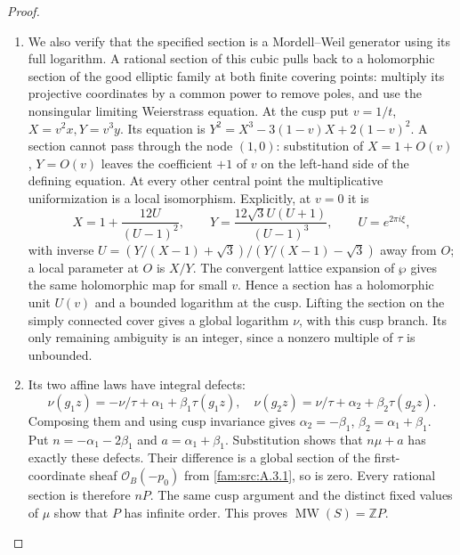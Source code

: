 \begin{proof}
\begin{enumerate}[label=\arabic*.,leftmargin=*]
\item We also verify that the specified section is a Mordell--Weil generator using its full logarithm. A rational section of this cubic pulls back to a holomorphic section of the good elliptic family at both finite covering points: multiply its projective coordinates by a common power to remove poles, and use the nonsingular limiting Weierstrass equation. At the cusp put $v=1/t$, $X=v^2x,Y=v^3y$. Its equation is $Y^2=X^3-3(1-v)X+2(1-v)^2$. A section cannot pass through the node $(1,0)$: substitution of $X=1+O(v)$, $Y=O(v)$ leaves the coefficient $+1$ of $v$ on the left-hand side of the defining equation. At every other central point the multiplicative uniformization is a local isomorphism. Explicitly, at $v=0$ it is
\[
 X=1+\frac{12U}{(U-1)^2},\qquad
 Y=\frac{12\sqrt3 U(U+1)}{(U-1)^3},\qquad U=e^{2\pi i\xi},
\]
with inverse $U=(Y/(X-1)+\sqrt3)/(Y/(X-1)-\sqrt3)$ away from $O$; a local parameter at $O$ is $X/Y$. The convergent lattice expansion of $\wp$ gives the same holomorphic map for small $v$. Hence a section has a holomorphic unit $U(v)$ and a bounded logarithm at the cusp. Lifting the section on the simply connected cover gives a global logarithm $\nu$, with this cusp branch. Its only remaining ambiguity is an integer, since a nonzero multiple of $\tau$ is unbounded.

\item Its two affine laws have integral defects:
\[
 \nu(g_1z)=-\nu/\tau+\alpha_1+\beta_1\tau(g_1z),\quad
 \nu(g_2z)=\nu/\tau+\alpha_2+\beta_2\tau(g_2z).
\]
Composing them and using cusp invariance gives $\alpha_2=-\beta_1$, $\beta_2=\alpha_1+\beta_1$. Put $n=-\alpha_1-2\beta_1$ and $a=\alpha_1+\beta_1$. Substitution shows that $n\mu+a$ has exactly these defects. Their difference is a global section of the first-coordinate sheaf $\mathcal O_B(-p_0)$ from \ref{fam:src:A.3.1}, so is zero. Every rational section is therefore $nP$. The same cusp argument and the distinct fixed values of $\mu$ show that $P$ has infinite order. This proves $\operatorname{MW}(S)=\mathbb ZP$.
\end{enumerate}
\end{proof}

